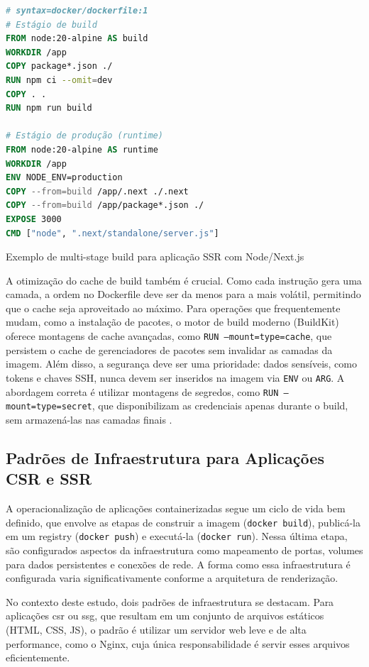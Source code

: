 \begin{codigo}[H]
\begin{lstlisting}[language=Dockerfile]
# syntax=docker/dockerfile:1
# Estágio de build
FROM node:20-alpine AS build
WORKDIR /app
COPY package*.json ./
RUN npm ci --omit=dev
COPY . .
RUN npm run build

# Estágio de produção (runtime)
FROM node:20-alpine AS runtime
WORKDIR /app
ENV NODE_ENV=production
COPY --from=build /app/.next ./.next
COPY --from=build /app/package*.json ./
EXPOSE 3000
CMD ["node", ".next/standalone/server.js"]
\end{lstlisting}
\caption{Exemplo de multi-stage build para aplicação SSR com Node/Next.js}
\label{lst:dockerfile-multistage}
\end{codigo}

A otimização do cache de build também é crucial. Como cada instrução gera uma camada, a ordem no Dockerfile deve ser da menos para a mais volátil, permitindo que o cache seja aproveitado ao máximo. Para operações que frequentemente mudam, como a instalação de pacotes, o motor de build moderno (BuildKit) oferece montagens de cache avançadas, como \texttt{RUN --mount=type=cache}, que persistem o cache de gerenciadores de pacotes sem invalidar as camadas da imagem. Além disso, a segurança deve ser uma prioridade: dados sensíveis, como tokens e chaves SSH, nunca devem ser inseridos na imagem via \texttt{ENV} ou \texttt{ARG}. A abordagem correta é utilizar montagens de segredos, como \texttt{RUN --mount=type=secret}, que disponibilizam as credenciais apenas durante o build, sem armazená-las nas camadas finais \cite{dockerfile_ref}.

\subsection{Padrões de Infraestrutura para Aplicações CSR e SSR}
\label{sec:docker-padroes-infra}

A operacionalização de aplicações containerizadas segue um ciclo de vida bem definido, que envolve as etapas de construir a imagem (\texttt{docker build}), publicá-la em um registry (\texttt{docker push}) e executá-la (\texttt{docker run}). Nessa última etapa, são configurados aspectos da infraestrutura como mapeamento de portas, volumes para dados persistentes e conexões de rede. A forma como essa infraestrutura é configurada varia significativamente conforme a arquitetura de renderização.

No contexto deste estudo, dois padrões de infraestrutura se destacam. Para aplicações \acrshort{csr} ou \acrshort{ssg}, que resultam em um conjunto de arquivos estáticos (HTML, CSS, JS), o padrão é utilizar um servidor web leve e de alta performance, como o Nginx, cuja única responsabilidade é servir esses arquivos eficientemente.

